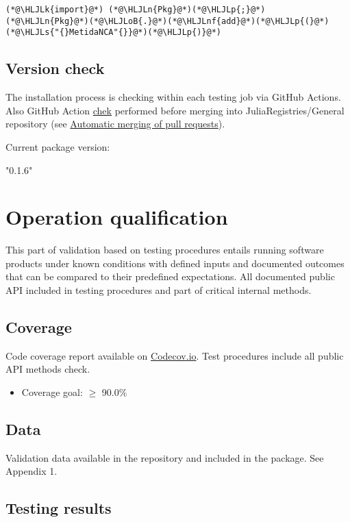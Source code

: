 \documentclass[12pt,a4paper]{article}
\newcommand{\HLJLk}[1]{\textcolor[RGB]{148,91,176}{\textbf{#1}}}
\newcommand{\HLJLn}[1]{#1}
\newcommand{\HLJLnf}[1]{\textcolor[RGB]{66,102,213}{#1}}
\newcommand{\HLJLs}[1]{\textcolor[RGB]{201,61,57}{#1}}
\newcommand{\HLJLoB}[1]{\textcolor[RGB]{102,102,102}{\textbf{#1}}}
\newcommand{\HLJLp}[1]{#1}
\begin{document}
\begin{lstlisting}
(*@\HLJLk{import}@*) (*@\HLJLn{Pkg}@*)(*@\HLJLp{;}@*) (*@\HLJLn{Pkg}@*)(*@\HLJLoB{.}@*)(*@\HLJLnf{add}@*)(*@\HLJLp{(}@*)(*@\HLJLs{"{}MetidaNCA"{}}@*)(*@\HLJLp{)}@*)
\end{lstlisting}

\subsection{Version check}
The installation process is checking within each testing job via GitHub Actions. Also GitHub Action \href{https://github.com/JuliaRegistries/General/blob/master/.github/workflows/automerge.yml}{chek} performed before merging into JuliaRegistries/General repository (see \href{https://github.com/JuliaRegistries/General#automatic-merging-of-pull-requests}{Automatic merging of pull requests}).



Current package version:


"0.1.6"


\section{Operation qualification}
This part of validation based on testing procedures entails running software products under known conditions with defined inputs and documented outcomes that can be compared to their predefined expectations. All documented public API included in testing procedures and part of critical internal methods.

\subsection{Coverage}
Code coverage report available on \href{https://app.codecov.io/gh/PharmCat/MetidaNCA.jl}{Codecov.io}. Test procedures include all  public API methods check.

\begin{itemize}
\item Coverage goal: \ensuremath{\geq} 90.0\%

\end{itemize}
\subsection{Data}
Validation data available in the repository and included in the package. See Appendix 1.

\subsection{Testing results}
\end{document}
